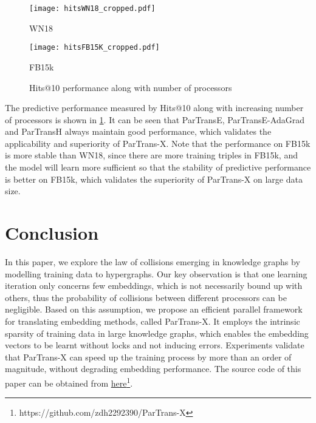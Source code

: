 \documentclass[sigconf]{acmart}
\begin{document}
\begin{figure}[htbp]
\begin{minipage}[t]{0.45\linewidth}
\centering
\texttt{[image: hitsWN18\_cropped.pdf]}
\vspace{-15pt}
\caption*{WN18}
\end{minipage}
\begin{minipage}[t]{0.45\linewidth}
\centering
\texttt{[image: hitsFB15K\_cropped.pdf]}
\vspace{-15pt}
\caption*{FB15k}
\end{minipage}
\vspace{-7pt}
\caption{Hits@10 performance along with number of processors}
\label{performance}
\vspace{-10pt}
\end{figure}




 The predictive performance measured by Hits@10 along with increasing number of processors is shown in \figurename \ref{performance}. It can be seen that ParTransE, ParTransE-AdaGrad and ParTransH always maintain good performance, which  validates the applicability  and superiority of  ParTrans-X. Note that the performance on FB15k is more stable than WN18, since there are more training triples in FB15k, and the model will learn more sufficient so that the stability of predictive performance is better on FB15k, which validates the superiority of ParTrans-X on large data size.



\section{Conclusion}
In this paper, we explore the law of collisions emerging in knowledge graphs by modelling training data to hypergraphs. Our key observation is that 
one learning iteration only concerns few embeddings, which is not necessarily bound up with others, thus the probability of collisions between different processors can be negligible. 
Based on this assumption, we propose an efficient parallel framework for translating embedding methods, called ParTrans-X. It employs the intrinsic sparsity of training data in large knowledge graphs, which enables the embedding vectors to be learnt without locks and not inducing errors.  
Experiments validate that ParTrans-X can speed up the training process by more than an order of magnitude, without degrading embedding performance. The source code of this paper can be obtained from \href{https://github.com/zdh2292390/ParTrans-X}{here}\footnote{https://github.com/zdh2292390/ParTrans-X}.
\end{document}
